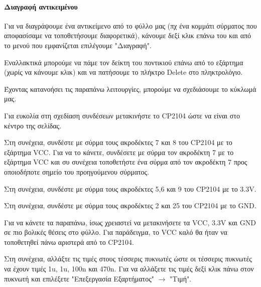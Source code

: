 \documentclass[a4paper]{article}
\begin{document}
\paragraph{Διαγραφή αντικειμένου}
Για να διαγράψουμε ένα αντικείμενο από το φύλλο μας (πχ ένα κομμάτι σύρματος που αποφασίσαμε να τοποθετήσουμε διαφορετικά), κάνουμε δεξί κλικ επάνω του και από το μενού που εμφανίζεται επιλέγουμε "Διαγραφή".

Εναλλακτικά μπορούμε να πάμε τον δείκτη του ποντικιού επάνω από το εξάρτημα (χωρίς να κάνουμε κλικ) και να πατήσουμε το πλήκτρο Delete στο πληκτρολόγιο.

Έχοντας κατανοήσει τις παραπάνω λειτουργίες, μπορούμε να σχεδιάσουμε το κύκλωμά μας.

Για ευκολία στη σχεδίαση συνδέσεων μετακινήστε το \textenglish{CP2104} ώστε να είναι στο κέντρο της σελίδας.

Στη συνέχεια, συνδέστε με σύρμα τους ακροδέκτες 7 και 8 του \textenglish{CP2104} με το εξάρτημα VCC. Για να το κάνετε, συνδέσετε με σύρμα τον ακροδέκτη 7 με το εξάρτημα VCC και συ συνέχεια τοποθετήστε ένα σύρμα από τον  ακροδέκτη 7 προς οποιοδήποτε σημείο του προηγούμενου σύρματος.

Στη συνέχεια, συνδέστε με σύρμα τους ακροδέκτες 5,6 και 9 του \textenglish{CP2104} με το 3.3V.

Στη συνέχεια, συνδέστε με σύρμα τους ακροδέκτες 2 και 25 του \textenglish{CP2104} με το GND.

\begin{figure}
  \begin{center}
    \label{fig:kicad-main}
  \end{center}
\end{figure}

Για να κάνετε τα παραπάνω, ίσως χρειαστεί να μετακινήσετε τα VCC, 3.3V και GND σε πιο βολικές θέσεις στο φύλλο. Για παράδειγμα, το VCC καλό θα ήταν να τοποθετηθεί πάνω αριστερά από το \textenglish{CP2104}.

\begin{figure}
  \begin{center}
    \label{fig:kicad-main}
  \end{center}
\end{figure}

Στη συνέχεια, αλλάξτε τις τιμές στους τέσσερις πυκνωτές ώστε οι τέσσερις πυκνωτές να έχουν τιμές 1u, 1u, 100n και 470n. Για να αλλάξετε τις τιμές δεξί κλικ πάνω στον πυκνωτή και επιλέξετε "Επεξεργασία Εξαρτήματος" $\rightarrow$ "Τιμή".
\end{document}
